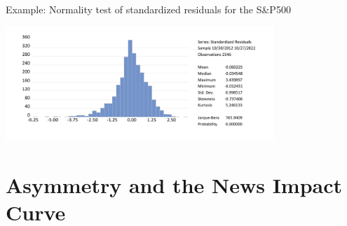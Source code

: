 \begin{frame}%

\begin{block}{Example: Normality test of standardized residuals for the S\&P500}
\centerline{\includegraphics[height=1.7in]{hist_resids}}
\end{block}

\end{frame}%


\section[Asymmetry]{Asymmetry and the News Impact Curve}\subsection*{}

